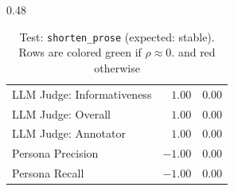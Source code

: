 \begin{table}[htbp]
\begin{subtable}[t]{0.48\textwidth}
\begin{tabular}{lrr}
\rowcolor{matchFalse} LLM Judge: Informativeness            &   $1.00$ &  0.00 \\
\rowcolor{matchFalse} LLM Judge: Overall                    &   $1.00$ &  0.00 \\
\rowcolor{matchFalse} LLM Judge: Annotator        &   $1.00$ &  0.00 \\
\rowcolor{matchFalse} Persona Precision                     &  $-1.00$ &  0.00 \\
\rowcolor{matchFalse} Persona Recall                        &  $-1.00$ &  0.00 \\
\bottomrule
\end{tabular}
\caption{LLM metrics}
\end{subtable}
\caption{Test: \texttt{shorten\_prose} (expected: stable). Rows are colored green if $\rho\approx0$. and red otherwise}
\label{tab:shorten_prose}
\end{table}